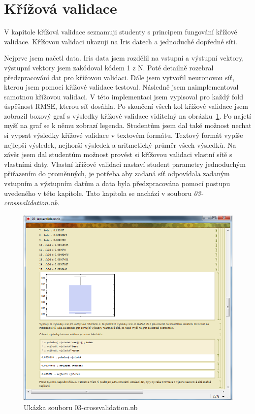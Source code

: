 \documentclass[11pt,twoside,a4paper]{book}
\begin{document}
\section{Křížová validace}
V kapitole křížová validace seznamuji studenty s principem fungování křížové validace. Křížovou validaci ukazuji na Iris datech a jednoduché dopředné síti.

Nejprve jsem načetl data. Iris data jsem rozdělil na vstupní a výstupní vektory, výstupní vektory jsem zakódoval kódem 1 z N. Poté detailně rozebral předzpracování dat pro křížovou validaci. Dále jsem vytvořil neuronovou síť, kterou jsem pomocí křížové validace testoval. Následně jsem naimplementoval samotnou křížovou validaci. V této implementaci jsem vypisoval pro každý fold úspěšnost RMSE, kterou síť dosáhla. Po skončení všech kol křížové validace jsem zobrazil boxový graf s výsledky křížové validace viditelný na obrázku~\ref{fig:krossvalidace}. Po najetí myší na graf se k němu zobrazí legenda. Studentům jsem dal také možnost nechat si vypsat výsledky křížové validace v textovém formátu. Textový formát vypíše nejlepší výsledek, nejhorší výsledek a aritmetický průměr všech výsledků. Na závěr jsem dal studentům možnost provést si křížovou validaci vlastní sítě s vlastními daty. Vlastní křížové validaci nastaví student parametry jednoduchým přiřazením do proměnných, je potřeba aby  zadaná síť odpovídala zadaným vstupním a výstupním datům a data byla předzpracována pomocí postupu uvedeného v této kapitole. Tato kapitola se nachází v souboru \textit{03-crossvalidation.nb}.

\begin{figure}[h!]
\begin{center}
\includegraphics[height=10cm]{figures/ukazka03.png}
\caption{Ukázka souboru 03-crossvalidation.nb}
\label{fig:krossvalidace}
\end{center}
\end{figure}
\end{document}

